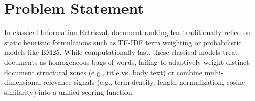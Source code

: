 \documentclass[11pt,a4paper]{article}
\begin{document}


\section{Problem Statement}
In classical Information Retrieval, document ranking has traditionally relied on static heuristic formulations such as TF-IDF term weighting or probabilistic models like BM25. While computationally fast, these classical models treat documents as homogeneous bags of words, failing to adaptively weight distinct document structural zones (e.g., title vs. body text) or combine multi-dimensional relevance signals (e.g., term density, length normalization, cosine similarity) into a unified scoring function.
\end{document}
